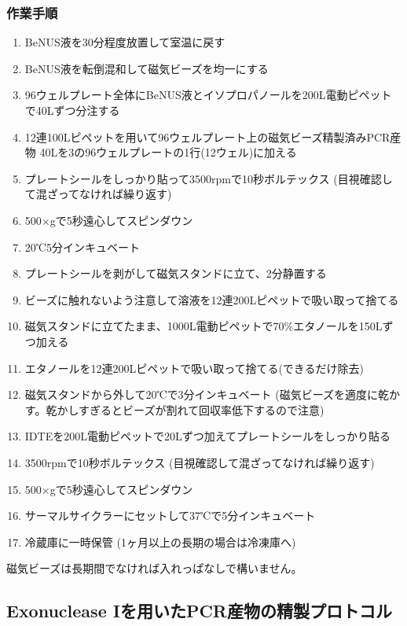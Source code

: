 \documentclass[titlepage,10pt,a4paper,uplatex]{jsbook}
\begin{document}
\subsubsection{作業手順}
\begin{enumerate}
\item BeNUS液を30分程度放置して室温に戻す
\item BeNUS液を転倒混和して磁気ビーズを均一にする
\item 96ウェルプレート全体にBeNUS液とイソプロパノールを200{\textmu}L電動ピペットで40{\textmu}Lずつ分注する
\item 12連100{\textmu}Lピペットを用いて96ウェルプレート上の磁気ビーズ精製済みPCR産物 40{\textmu}Lを3の96ウェルプレートの1行(12ウェル)に加える
\item プレートシールをしっかり貼って3500rpmで10秒ボルテックス (目視確認して混ざってなければ繰り返す)
\item 500×gで5秒遠心してスピンダウン
\item 20℃5分インキュベート
\item プレートシールを剥がして磁気スタンドに立て、2分静置する
\item ビーズに触れないよう注意して溶液を12連200{\textmu}Lピペットで吸い取って捨てる
\item 磁気スタンドに立てたまま、1000{\textmu}L電動ピペットで70\%エタノールを150{\textmu}Lずつ加える
\item エタノールを12連200{\textmu}Lピペットで吸い取って捨てる(できるだけ除去)
\item 磁気スタンドから外して20℃で3分インキュベート (磁気ビーズを適度に乾かす。乾かしすぎるとビーズが割れて回収率低下するので注意)
\item IDTEを200{\textmu}L電動ピペットで20{\textmu}Lずつ加えてプレートシールをしっかり貼る
\item 3500rpmで10秒ボルテックス (目視確認して混ざってなければ繰り返す)
\item 500×gで5秒遠心してスピンダウン
\item サーマルサイクラーにセットして37℃で5分インキュベート
\item 冷蔵庫に一時保管 (1ヶ月以上の長期の場合は冷凍庫へ)
\end{enumerate}

磁気ビーズは長期間でなければ入れっぱなしで構いません。

\subsection{Exonuclease Iを用いたPCR産物の精製プロトコル}
\end{document}
